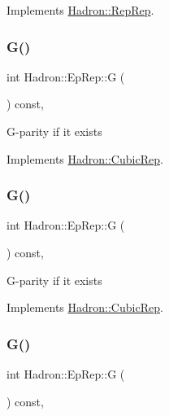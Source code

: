 Implements \mbox{\hyperlink{structHadron_1_1RepRep_a92c8802e5ed7afd7da43ccfd5b7cd92b}{Hadron\+::\+Rep\+Rep}}.

\mbox{\label{structHadron_1_1EpRep_a83c706de18931ef00c9909e5ab053d68}} 
\subsubsection{\texorpdfstring{G()}{G()}\hspace{0.1cm}{\footnotesize\ttfamily [1/3]}}
{\footnotesize\ttfamily int Hadron\+::\+Ep\+Rep\+::G (\begin{DoxyParamCaption}{ }\end{DoxyParamCaption}) const\hspace{0.3cm}{\ttfamily [inline]}, {\ttfamily [virtual]}}

G-\/parity if it exists 

Implements \mbox{\hyperlink{structHadron_1_1CubicRep_a52104e43266d1614c00bbd1c3b395458}{Hadron\+::\+Cubic\+Rep}}.

\mbox{\label{structHadron_1_1EpRep_a83c706de18931ef00c9909e5ab053d68}} 
\subsubsection{\texorpdfstring{G()}{G()}\hspace{0.1cm}{\footnotesize\ttfamily [2/3]}}
{\footnotesize\ttfamily int Hadron\+::\+Ep\+Rep\+::G (\begin{DoxyParamCaption}{ }\end{DoxyParamCaption}) const\hspace{0.3cm}{\ttfamily [inline]}, {\ttfamily [virtual]}}

G-\/parity if it exists 

Implements \mbox{\hyperlink{structHadron_1_1CubicRep_a52104e43266d1614c00bbd1c3b395458}{Hadron\+::\+Cubic\+Rep}}.

\mbox{\label{structHadron_1_1EpRep_a83c706de18931ef00c9909e5ab053d68}} 
\subsubsection{\texorpdfstring{G()}{G()}\hspace{0.1cm}{\footnotesize\ttfamily [3/3]}}
{\footnotesize\ttfamily int Hadron\+::\+Ep\+Rep\+::G (\begin{DoxyParamCaption}{ }\end{DoxyParamCaption}) const\hspace{0.3cm}{\ttfamily [inline]}, {\ttfamily [virtual]}}

